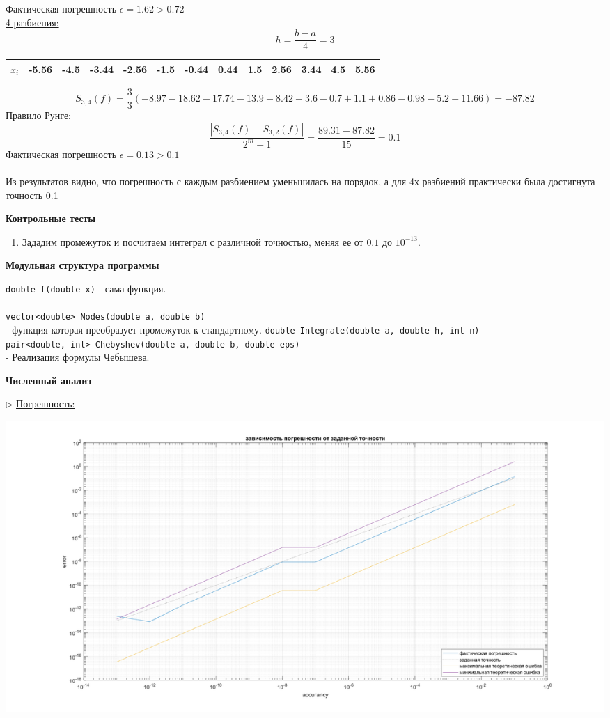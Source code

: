\documentclass{article}
\begin{document}
	Фактическая погрешность $\epsilon = 1.62 > 0.72$\\
	\underline{4 разбиения:}\\
	$$h = \frac{b-a}{4} = 3$$
	\begin{center}
		\begin{tabular}{|c|c|c|c|c|c|c|c|c|c|c|c|c|}
			\hline
			$x_i$ & -5.56 & -4.5 & -3.44 & -2.56 & -1.5 & -0.44 & 0.44 & 1.5 & 2.56 & 3.44 & 4.5 & 5.56\\ 
			\hline
		\end{tabular}
	\end{center}
	$$S_{3, 4}(f) = \frac{3}{3}(-8.97 - 18.62 - 17.74 - 13.9 - 8.42 - 3.6 - 0.7 + 1.1 + 0.86 - 0.98 - 5.2 - 11.66) = -87.82$$
	Правило Рунге:
	$$\frac{|S_{3, 4}(f) - S_{3, 2}(f)|}{2^m - 1} = \frac{89.31-87.82}{15} = 0.1$$
	Фактическая погрешность $\epsilon = 0.13 > 0.1$\\
	\\
	Из результатов видно, что погрешность с каждым разбиением уменьшилась на порядок, а для 4х разбиений практически была достигнута точность 0.1
	\begin{center} \textbf{Контрольные тесты}\end{center}
	\begin{enumerate}
		\item Зададим промежуток и посчитаем интеграл с различной точностью, меняя ее от $0.1$ до $10^{-13}$.
	\end{enumerate}
	\begin{center} \textbf{Модульная структура программы}\end{center}
	\verb|double f(double x)|
	- сама функция.\\
	\\
	\verb|vector<double> Nodes(double a, double b)|\\
	- функция которая преобразует промежуток к стандартному.
	\verb|double Integrate(double a, double h, int n)|\\
	\verb|pair<double, int> Chebyshev(double a, double b, double eps)|\\
	- Реализация формулы Чебышева.
	\newpage
	\begin{center} \textbf{Численный анализ}\end{center}
	$\triangleright$ \underline{Погрешность:}\\
	\begin{center} \includegraphics[scale = 0.4]{Погрешность} \end{center}
\end{document}
